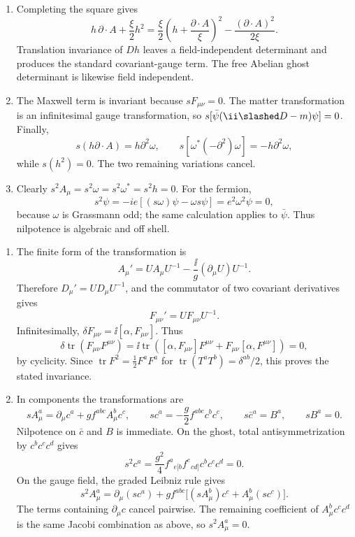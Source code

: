 \begin{enumerate}
  \begin{enumerate}
    \item[(a)] Completing the square gives
      \[
        h\,\partial\cdot A+\frac{\xi}{2}h^2
        =\frac{\xi}{2}\left(h+\frac{\partial\cdot A}{\xi}\right)^2
          -\frac{(\partial\cdot A)^2}{2\xi}.
      \]
      Translation invariance of \(Dh\) leaves a field-independent
      determinant and produces the standard covariant-gauge term.  The
      free Abelian ghost determinant is likewise field independent.
    \item[(b)] The Maxwell term is invariant because
      \(sF_{\mu\nu}=0\).  The matter transformation is an infinitesimal
      gauge transformation, so
      \(s[\bar\psi(\ii\slashed D-m)\psi]=0\).  Finally,
      \[
        s(h\partial\cdot A)=h\partial^2\omega,\qquad
        s[\omega^*(-\partial^2)\omega]
          =-h\partial^2\omega ,
      \]
      while \(s(h^2)=0\).  The two remaining variations cancel.
    \item[(c)] Clearly \(s^2A_\mu=s^2\omega=s^2\omega^*=s^2h=0\).
      For the fermion,
      \[
        s^2\psi=-ie[(s\omega)\psi-\omega s\psi]
          =e^2\omega^2\psi=0,
      \]
      because \(\omega\) is Grassmann odd; the same calculation applies
      to \(\bar\psi\).  Thus nilpotence is algebraic and off shell.
  \end{enumerate}

  \begin{enumerate}
    \item[(a)] The finite form of the transformation is
      \[
        A_\mu' =UA_\mu U^{-1}-\frac{\ii}{g}(\partial_\mu U)U^{-1}.
      \]
      Therefore \(D_\mu'=UD_\mu U^{-1}\), and the commutator of two
      covariant derivatives gives
      \[
        F_{\mu\nu}'=UF_{\mu\nu}U^{-1}.
      \]
      Infinitesimally,
      \(\delta F_{\mu\nu}=\ii[\alpha,F_{\mu\nu}]\).  Thus
      \[
        \delta\operatorname{tr}(F_{\mu\nu}F^{\mu\nu})
          =\ii\operatorname{tr}
            ([\alpha,F_{\mu\nu}]F^{\mu\nu}
             +F_{\mu\nu}[\alpha,F^{\mu\nu}])=0,
      \]
      by cyclicity.  Since
      \(\operatorname{tr}F^2=\tfrac12F^aF^a\) for
      \(\operatorname{tr}(T^aT^b)=\delta^{ab}/2\), this proves the stated
      invariance.

    \item[(b)] In components the transformations are
      \[
        sA_\mu^a=\partial_\mu c^a+gf^{abc}A_\mu^bc^c,
        \qquad
        sc^a=-\frac g2f^{abc}c^bc^c,
        \qquad s\bar c^a=B^a,\qquad sB^a=0.
      \]
      Nilpotence on \(\bar c\) and \(B\) is immediate.  On the ghost,
      total antisymmetrization by \(c^bc^cc^d\) gives
      \[
        s^2c^a=\frac{g^2}{4}f^a{}_{e[b}f^e{}_{cd]}
          c^bc^cc^d=0.
      \]
      On the gauge field, the graded Leibniz rule gives
      \[
        s^2A_\mu^a
          =\partial_\mu(sc^a)+gf^{abc}
             \bigl[(sA_\mu^b)c^c+A_\mu^b(sc^c)\bigr].
      \]
      The terms containing \(\partial_\mu c\) cancel pairwise.  The
      remaining coefficient of \(A_\mu^bc^cc^d\) is the same Jacobi
      combination as above, so \(s^2A_\mu^a=0\).


\end{enumerate}
\end{enumerate}
